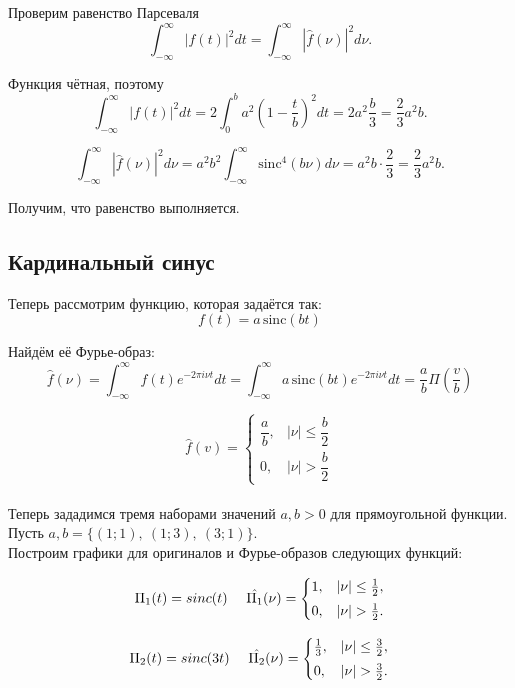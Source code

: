\documentclass[a4paper, 12pt]{article}
\begin{document}
Проверим равенство Парсеваля
\[
\int_{-\infty}^{\infty}|f(t)|^2dt
=
\int_{-\infty}^{\infty}|\hat f(\nu)|^2d\nu .
\]

Функция чётная, поэтому
\[
\int_{-\infty}^{\infty}|f(t)|^2dt
=
2\int_0^b a^2\left(1-\frac{t}{b}\right)^2dt =
2a^2\frac{b}{3}
=
\frac{2}{3}a^2b.
\]

\[
\int_{-\infty}^{\infty}|\hat f(\nu)|^2d\nu
=
a^2b^2
\int_{-\infty}^{\infty}\mathrm{sinc}^4(b\nu)d\nu=
a^2b\cdot\frac{2}{3}
=
\frac{2}{3}a^2b.
\]

Получим, что равенство выполняется.

\subsection{Кардинальный синус}
Теперь рассмотрим функцию, которая задаётся так:
\[
    f(t)=a\,\mathrm{sinc}(bt)
\]

Найдём её Фурье-образ:
\begin{equation}
    \hat{f}(\nu) = \int^{\infty}_{-\infty} f(t)e^{-2\pi i \nu t}dt = \int^{\infty}_{-\infty} a\,\mathrm{sinc}(bt) e^{-2\pi i \nu t}dt = \frac{a}{b}\Pi\!\left(\frac{v}{b}\right)
    \label{equation: sinc img}    
\end{equation}



\[
\hat f(v) =
\begin{cases}
\dfrac{a}{b}, & |\nu|\le \dfrac{b}{2}\\[10pt]
0, & |\nu|>\dfrac{b}{2}
\end{cases}
\]\\

Теперь зададимся тремя наборами значений $a, b > 0$ для прямоугольной функции. Пусть $a, b = \{(1; 1),\ (1; 3),\ (3;1)\}$.\\

Построим графики для оригиналов и Фурье-образов следующих функций:

\[
{\Pi_1}(t) = sinc (t) 
    \ \ \ \
    \hat{\Pi_1}(\nu)=
    \begin{cases}
    1, & |\nu|\leq \frac{1}{2},\\[3pt]
    0, & |\nu|> \frac{1}{2}.
    \end{cases}\\[1pt]
\]

\[
{\Pi_2}(t) = sinc (3t) 
    \ \ \ \
    \hat{\Pi_2}(\nu)=
    \begin{cases}
    \frac{1}{3}, & |\nu|\leq \frac{3}{2},\\[3pt]
    0, & |\nu|> \frac{3}{2}.
    \end{cases}\\[1pt]
\]
\end{document}
